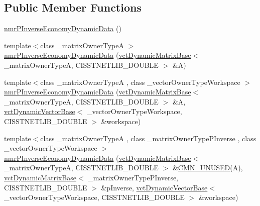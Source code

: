 \subsection*{Public Member Functions}
\begin{DoxyCompactItemize}
\item 
\hyperlink{classnmr_p_inverse_economy_dynamic_data_a8544f64bb47204c6dd54a3ed7198c9d5}{nmr\-P\-Inverse\-Economy\-Dynamic\-Data} ()
\item 
{\footnotesize template$<$class \-\_\-matrix\-Owner\-Type\-A $>$ }\\\hyperlink{classnmr_p_inverse_economy_dynamic_data_aaed0dc0e03a151b98ae4d1c816f8c5bc}{nmr\-P\-Inverse\-Economy\-Dynamic\-Data} (\hyperlink{classvct_dynamic_matrix_base}{vct\-Dynamic\-Matrix\-Base}$<$ \-\_\-matrix\-Owner\-Type\-A, C\-I\-S\-S\-T\-N\-E\-T\-L\-I\-B\-\_\-\-D\-O\-U\-B\-L\-E $>$ \&A)
\item 
{\footnotesize template$<$class \-\_\-matrix\-Owner\-Type\-A , class \-\_\-vector\-Owner\-Type\-Workspace $>$ }\\\hyperlink{classnmr_p_inverse_economy_dynamic_data_a76e30639df6c003c388a63bfd16ce953}{nmr\-P\-Inverse\-Economy\-Dynamic\-Data} (\hyperlink{classvct_dynamic_matrix_base}{vct\-Dynamic\-Matrix\-Base}$<$ \-\_\-matrix\-Owner\-Type\-A, C\-I\-S\-S\-T\-N\-E\-T\-L\-I\-B\-\_\-\-D\-O\-U\-B\-L\-E $>$ \&A, \hyperlink{classvct_dynamic_vector_base}{vct\-Dynamic\-Vector\-Base}$<$ \-\_\-vector\-Owner\-Type\-Workspace, C\-I\-S\-S\-T\-N\-E\-T\-L\-I\-B\-\_\-\-D\-O\-U\-B\-L\-E $>$ \&workspace)
\item 
{\footnotesize template$<$class \-\_\-matrix\-Owner\-Type\-A , class \-\_\-matrix\-Owner\-Type\-P\-Inverse , class \-\_\-vector\-Owner\-Type\-Workspace $>$ }\\\hyperlink{classnmr_p_inverse_economy_dynamic_data_a645d6152dcfc45511e48b53344b96120}{nmr\-P\-Inverse\-Economy\-Dynamic\-Data} (\hyperlink{classvct_dynamic_matrix_base}{vct\-Dynamic\-Matrix\-Base}$<$ \-\_\-matrix\-Owner\-Type\-A, C\-I\-S\-S\-T\-N\-E\-T\-L\-I\-B\-\_\-\-D\-O\-U\-B\-L\-E $>$ \&\hyperlink{cmn_portability_8h_a021894e2626935fa2305434b1e893ff6}{C\-M\-N\-\_\-\-U\-N\-U\-S\-E\-D}(A), \hyperlink{classvct_dynamic_matrix_base}{vct\-Dynamic\-Matrix\-Base}$<$ \-\_\-matrix\-Owner\-Type\-P\-Inverse, C\-I\-S\-S\-T\-N\-E\-T\-L\-I\-B\-\_\-\-D\-O\-U\-B\-L\-E $>$ \&p\-Inverse, \hyperlink{classvct_dynamic_vector_base}{vct\-Dynamic\-Vector\-Base}$<$ \-\_\-vector\-Owner\-Type\-Workspace, C\-I\-S\-S\-T\-N\-E\-T\-L\-I\-B\-\_\-\-D\-O\-U\-B\-L\-E $>$ \&workspace)
\item 

\end{DoxyCompactItemize}
